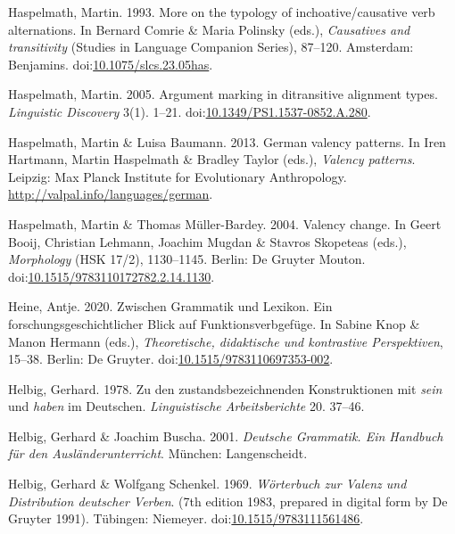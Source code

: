 \leavevmode{}%
Haspelmath, Martin. 1993. More on the typology of inchoative/causative
verb alternations. In Bernard Comrie \& Maria Polinsky (eds.),
\emph{Causatives and transitivity} (Studies in Language Companion
Series), 87--120. Amsterdam: Benjamins.
doi:\href{https://doi.org/10.1075/slcs.23.05has}{10.1075/slcs.23.05has}.

\leavevmode{}%
Haspelmath, Martin. 2005. Argument marking in ditransitive alignment
types. \emph{Linguistic Discovery} 3(1). 1--21.
doi:\href{https://doi.org/10.1349/PS1.1537-0852.A.280}{10.1349/PS1.1537-0852.A.280}.

\leavevmode{}%
Haspelmath, Martin \& Luisa Baumann. 2013. German valency patterns. In
Iren Hartmann, Martin Haspelmath \& Bradley Taylor (eds.), \emph{Valency
patterns}. Leipzig: Max Planck Institute for Evolutionary Anthropology.
\url{http://valpal.info/languages/german}.

\leavevmode{}%
Haspelmath, Martin \& Thomas Müller-Bardey. 2004. Valency change. In
Geert Booij, Christian Lehmann, Joachim Mugdan \& Stavros Skopeteas
(eds.), \emph{Morphology} (HSK 17/2), 1130--1145. Berlin: De Gruyter
Mouton.
doi:\href{https://doi.org/10.1515/9783110172782.2.14.1130}{10.1515/9783110172782.2.14.1130}.

\leavevmode{}%
Heine, Antje. 2020. Zwischen {Grammatik} und {Lexikon}. Ein
forschungsgeschichtlicher {Blick} auf {Funktionsverbgefüge}. In Sabine
Knop \& Manon Hermann (eds.), \emph{Theoretische, didaktische und
kontrastive {Perspektiven}}, 15--38. Berlin: De Gruyter.
doi:\href{https://doi.org/10.1515/9783110697353-002}{10.1515/9783110697353-002}.

\leavevmode{}%
Helbig, Gerhard. 1978. Zu den zustandsbezeichnenden {Konstruktionen} mit
\emph{sein} und \emph{haben} im {Deutschen}. \emph{Linguistische
Arbeitsberichte} 20. 37--46.

\leavevmode{}%
Helbig, Gerhard \& Joachim Buscha. 2001. \emph{Deutsche {Grammatik}.
{Ein} {Handbuch} für den {Ausländerunterricht}}. München: Langenscheidt.

\leavevmode{}%
Helbig, Gerhard \& Wolfgang Schenkel. 1969. \emph{Wörterbuch zur
{Valenz} und {Distribution} deutscher {Verben}}. (7th edition 1983,
prepared in digital form by De Gruyter 1991). Tübingen: Niemeyer.
doi:\href{https://doi.org/10.1515/9783111561486}{10.1515/9783111561486}.

